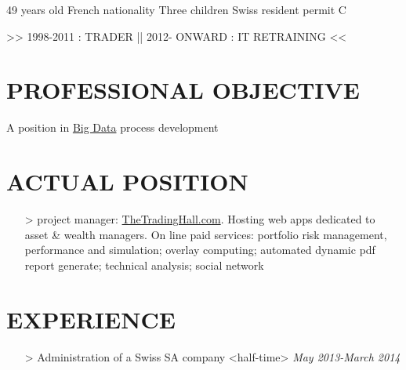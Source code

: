 \documentclass{res}
\begin{document}
\color{mygreen}
\pagecolor{myblack}


\address{Rue de la Dôle, 12 - 1203 Geneva  +41~(79)~392~##~##  arnaud.gaboury@gmail.com}        
\begin{resume}%
                        
\begin{center}  
\vspace{-0.8 cm}
49 years  old  French nationality  Three children  Swiss resident permit C 


\setlength{\fboxsep}{10pt}%

\textmd{>> 1998-2011 : TRADER || 2012- ONWARD : IT RETRAINING <<}
\end{center} 
\section{PROFESSIONAL OBJECTIVE}  
A position in \href{http://en.wikipedia.org/wiki/Big_data}{Big Data} process development 

\section{ACTUAL POSITION}
\begin{enumerate}[leftmargin=0cm]
\item[>] project manager: \href{http://thetradinghall.com}{TheTradingHall.com}. Hosting web apps dedicated to asset \& wealth managers. On line paid services: portfolio risk management, performance and simulation; overlay computing; automated dynamic pdf report generate; technical analysis; social network
\end{enumerate}
\section{EXPERIENCE}
\begin{enumerate}[leftmargin=0cm]
\item[>]Administration of a Swiss SA company <half-time>
\hfill \textit{May 2013-March 2014}


\end{enumerate}
\end{resume}
\end{document}
